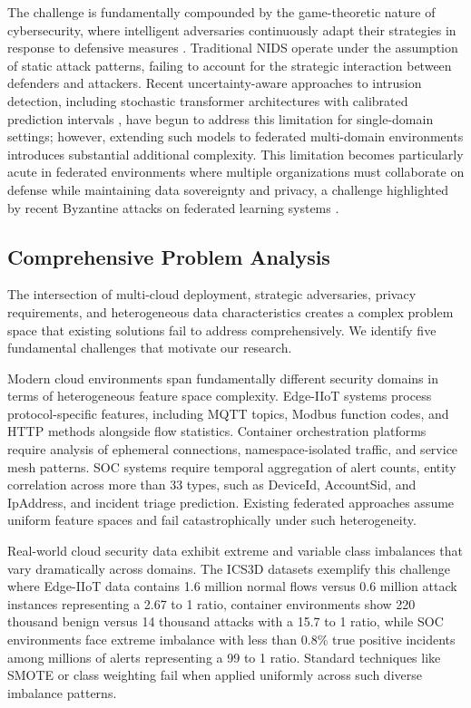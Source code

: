 \documentclass[12pt,a4paper]{article}
\theoremstyle{definition}
\begin{document}
The challenge is fundamentally compounded by the game-theoretic nature of cybersecurity, where intelligent adversaries continuously adapt their strategies in response to defensive measures \cite{manshaei2013game}. Traditional NIDS operate under the assumption of static attack patterns, failing to account for the strategic interaction between defenders and attackers. Recent uncertainty-aware approaches to intrusion detection, including stochastic transformer architectures with calibrated prediction intervals \cite{anaedevha2026stochastic}, have begun to address this limitation for single-domain settings; however, extending such models to federated multi-domain environments introduces substantial additional complexity. This limitation becomes particularly acute in federated environments where multiple organizations must collaborate on defense while maintaining data sovereignty and privacy, a challenge highlighted by recent Byzantine attacks on federated learning systems \cite{fang2020local}.

\subsection{Comprehensive Problem Analysis}

The intersection of multi-cloud deployment, strategic adversaries, privacy requirements, and heterogeneous data characteristics creates a complex problem space that existing solutions fail to address comprehensively. We identify five fundamental challenges that motivate our research.

Modern cloud environments span fundamentally different security domains in terms of heterogeneous feature space complexity. Edge-IIoT systems process protocol-specific features, including MQTT topics, Modbus function codes, and HTTP methods alongside flow statistics. Container orchestration platforms require analysis of ephemeral connections, namespace-isolated traffic, and service mesh patterns. SOC systems require temporal aggregation of alert counts, entity correlation across more than 33 types, such as DeviceId, AccountSid, and IpAddress, and incident triage prediction. Existing federated approaches assume uniform feature spaces and fail catastrophically under such heterogeneity.

Real-world cloud security data exhibit extreme and variable class imbalances that vary dramatically across domains. The ICS3D datasets exemplify this challenge where Edge-IIoT data contains 1.6 million normal flows versus 0.6 million attack instances representing a 2.67 to 1 ratio, container environments show 220 thousand benign versus 14 thousand attacks with a 15.7 to 1 ratio, while SOC environments face extreme imbalance with less than 0.8\% true positive incidents among millions of alerts representing a 99 to 1 ratio. Standard techniques like SMOTE or class weighting fail when applied uniformly across such diverse imbalance patterns.
\end{document}
